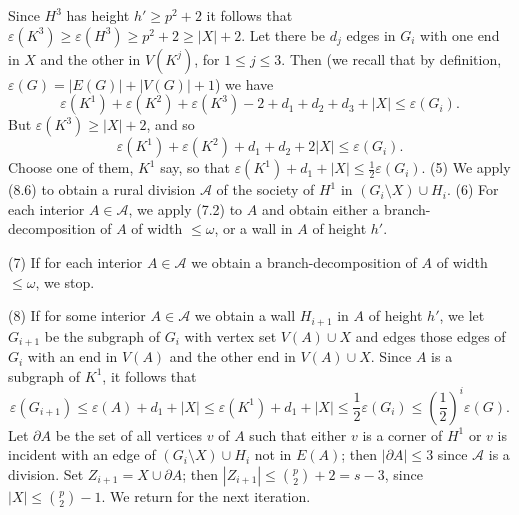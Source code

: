 Since $H^3$ has height $h' \ge p^2 + 2$ it follows that $\varepsilon(K^3) \ge \varepsilon(H^3) \ge p^2 + 2 \ge |X| + 2$. Let there be $d_j$ edges in $G_i$ with one end in $X$ and the other in $V(K^j)$, for $1 \le j \le 3$. Then (we recall that by definition, $\varepsilon(G) = |E(G)| + |V(G)| + 1$) we have
\begin{equation*}
\varepsilon(K^1) + \varepsilon(K^2) + \varepsilon(K^3) - 2 + d_1 + d_2 + d_3 + |X| \le \varepsilon(G_i).
\end{equation*}
But $\varepsilon(K^3) \ge |X| + 2$, and so
\begin{equation*}
\varepsilon(K^1) + \varepsilon(K^2) + d_1 + d_2 + 2 |X| \le \varepsilon(G_i).
\end{equation*}
Choose one of them, $K^1$ say, so that $\varepsilon(K^1) + d_1 + |X| \le \frac{1}{2}\varepsilon(G_i)$. (5) We apply (8.6) to obtain a rural division $\mathcal{A}$ of the society of $H^1$ in $(G_i \setminus X) \cup H_i$. (6) For each interior $A \in \mathcal{A}$, we apply (7.2) to $A$ and obtain either a branch-decomposition of $A$ of width $\le \omega$, or a wall in $A$ of height $h'$.

\hspace*{12pt}(7) If for each interior $A \in \mathcal{A}$ we obtain a branch-decomposition of $A$ of width $\le \omega$, we stop.

\hspace*{12pt}(8) If for some interior $A \in \mathcal{A}$ we obtain a wall $H_{i+1}$ in $A$ of height $h'$, we let $G_{i+1}$ be the subgraph of $G_i$ with vertex set $V(A) \cup X$ and edges those edges of $G_i$ with an end in $V(A)$ and the other end in $V(A) \cup X$. Since $A$ is a subgraph of $K^1$, it follows that
\begin{equation*}
\varepsilon(G_{i+1}) \le \varepsilon(A) + d_1 + |X| \le \varepsilon(K^1) + d_1 + |X| \le \frac{1}{2}\varepsilon(G_i) \le \left(\frac{1}{2}\right)^i \varepsilon(G).
\end{equation*}
Let $\partial A$ be the set of all vertices $v$ of $A$ such that either $v$ is a corner of $H^1$ or $v$ is incident with an edge of $(G_i \setminus X) \cup H_i$ not in $E(A)$; then $|\partial A| \le 3$ since $\mathcal{A}$ is a division. Set $Z_{i+1} = X \cup \partial A$; then $|Z_{i+1}| \le \binom{p}{2} + 2 = s - 3$, since $|X| \le \binom{p}{2} - 1$. We return for the next iteration.

